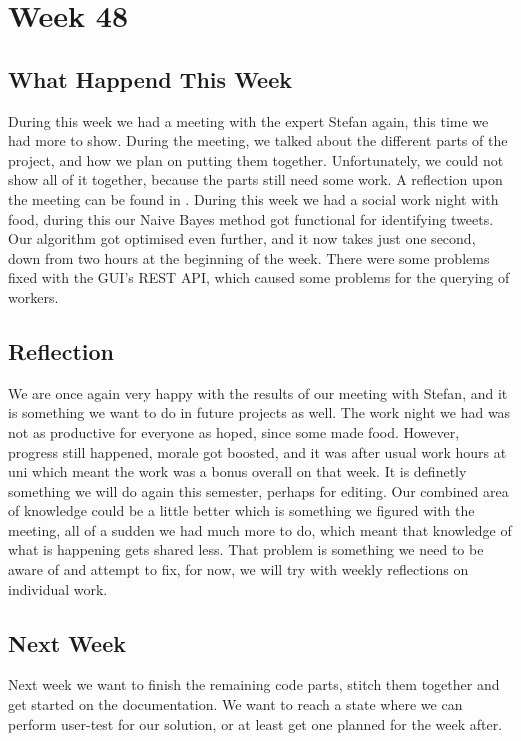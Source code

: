 \section*{Week 48} 
\subsection*{What Happend This Week}
During this week we had a meeting with the expert Stefan again, this time we had
more to show. During the meeting, we talked about the different parts of the
project, and how we plan on putting them together. Unfortunately, we could not
show all of it together, because the parts still need some work. A reflection
upon the meeting can be found in .
During this week we had a social work night with food, during this our Naive
Bayes method got functional for identifying tweets. Our algorithm got optimised
even further, and it now takes just one second, down from two hours at the
beginning of the week. There were some problems fixed with the \ac{GUI}'s
\ac{REST} \ac{API}, which caused some problems for the querying of workers.

\subsection*{Reflection}
We are once again very happy with the results of our meeting with Stefan, and it
is something we want to do in future projects as well. The work night we had was
not as productive for everyone as hoped, since some made food. However, progress
still happened, morale got boosted, and it was after usual work hours at uni
which meant the work was a bonus overall on that week. It is definetly something
we will do again this semester, perhaps for editing. Our combined area of
knowledge could be a little better which is something we figured with the
meeting, all of a sudden we had much more to do, which meant that knowledge of
what is happening gets shared less. That problem is something we need to be
aware of and attempt to fix, for now, we will try with weekly reflections on
individual work.

\subsection*{Next Week}
Next week we want to finish the remaining code parts, stitch them together and
get started on the documentation. We want to reach a state where we can perform
user-test for our solution, or at least get one planned for the week after.



